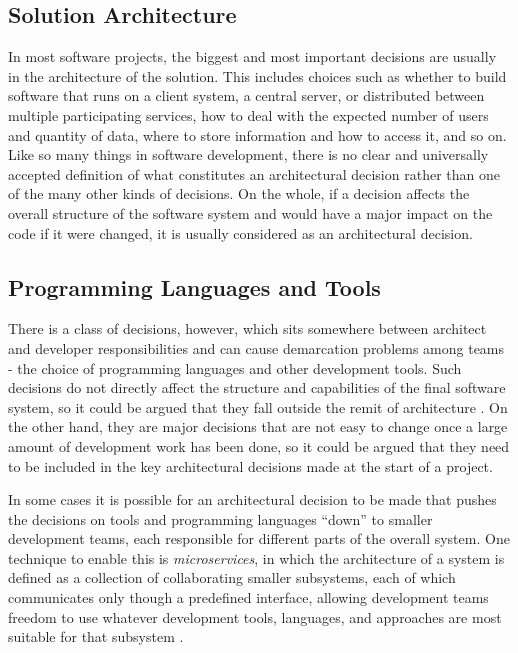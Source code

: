 \subsection{Solution Architecture}

In most software projects, the biggest and most important decisions are usually in the architecture of the solution. This includes choices such as whether to build software that runs on a client system, a central server, or distributed between multiple participating services, how to deal with the expected number of users and quantity of data, where to store information and how to access it, and so on. Like so many things in software development, there is no clear and universally accepted definition of what constitutes an architectural decision rather than one of the many other kinds of decisions. On the whole, if a decision affects the overall structure of the software system and would have a major impact on the code if it were changed, it is usually considered as an architectural decision.

\subsection{Programming Languages and Tools}

There is a class of decisions, however, which sits somewhere between architect and developer responsibilities and can cause demarcation problems among teams - the choice of \gls{programming language}s and other development tools. Such decisions do not directly affect the structure and capabilities of the final software system, so it could be argued that they fall outside the remit of architecture \citep{Mills1985}. On the other hand, they are major decisions that are not easy to change once a large amount of development work has been done, so it could be argued that they need to be included in the key architectural decisions made at the start of a project. \citep{Spinellis2006}

In some cases it is possible for an architectural decision to be made that pushes the decisions on tools and \gls{programming language}s \enquote{down} to smaller development teams, each responsible for different parts of the overall system. One technique to enable this is \emph{microservices}, in which the architecture of a system is defined as a collection of collaborating smaller subsystems, each of which communicates only though a predefined interface, allowing development teams freedom to use whatever development tools, languages, and approaches are most suitable for that subsystem \citep{Chen2022}.

